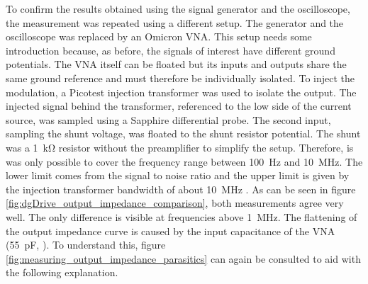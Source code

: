 To confirm the results obtained using the signal generator and the oscilloscope, the measurement was repeated using a different setup. The generator and the oscilloscope was replaced by an Omicron  VNA. This setup needs some introduction because, as before, the signals of interest have different ground potentials. The VNA itself can be floated but its inputs and outputs share the same ground reference and must therefore be individually isolated. To inject the modulation, a Picotest  injection transformer was used to isolate the output. The injected signal behind the transformer, referenced to the low side of the current source, was sampled using a Sapphire  differential probe. The second input, sampling the shunt voltage, was floated to the shunt resistor potential. The shunt was a \qty{1}{\kilo\ohm} resistor without the  preamplifier to simplify the setup. Therefore, is was only possible to cover the frequency range between \qty{100}{\Hz} and \qty{10}{\MHz}. The lower limit comes from the signal to noise ratio and the upper limit is given by the injection transformer bandwidth of about \qty{10}{\MHz} \cite{datasheet_j2101a}. As can be seen in figure \ref{fig:dgDrive_output_impedance_comparison}, both measurements agree very well. The only difference is visible at frequencies above \qty{1}{\MHz}. The flattening of the output impedance curve is caused by the input capacitance of the VNA (\qty{55}{\pF}, \cite{datasheet_bode100}). To understand this, figure \ref{fig:measuring_output_impedance_parasitics} can again be consulted to aid with the following explanation.

